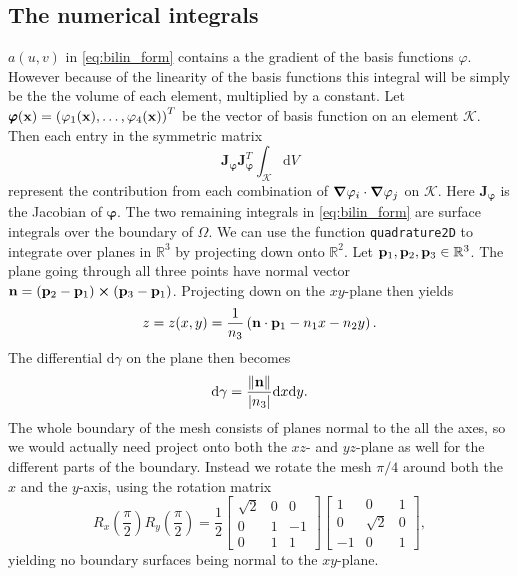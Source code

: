 \subsection{The numerical integrals}
$a(u,v)$ in \eqref{eq:bilin_form} contains a the gradient of the basis functions $\varphi$. However because of the linearity of the basis functions this integral will be simply be the the volume of each element, multiplied by a constant. Let $\pmb{\varphi}(\vb{x}) = \left(\varphi_1(\vb{x}),\dots,\varphi_4(\vb{x})\right)^T$ be the vector of basis function on an element $\mathcal{K}$. Then each entry in the symmetric matrix
\begin{equation}
    \pmb{J}_{\pmb{\varphi}}^{\phantom{}} \pmb{J}_{\pmb{\varphi}}^T\int_\mathcal{K} \! \mathrm{d}V
\end{equation}
represent the contribution from each combination of $\grad{\varphi_i}\cdot\grad{\varphi_j}$ on $\mathcal{K}$. Here $\pmb{J}_{\pmb{\varphi}}$ is the Jacobian of $\pmb{\varphi}$. The two remaining integrals in \eqref{eq:bilin_form} are surface integrals over the boundary of $\Omega$. We can use the function \texttt{quadrature2D} to integrate over planes in $\mathbb{R}^3$ by projecting down onto $\mathbb{R}^2$. Let $\vb{p}_1,\vb{p}_2,\vb{p}_3 \in \mathbb{R}^3$. The plane going through all three points have normal vector $\vb{n} = (\vb{p}_2-\vb{p}_1)\cross (\vb{p}_3-\vb{p}_1)$. Projecting down on the $xy$-plane then yields
\begin{equation}
    z = z(x,y)=\frac{1}{n_3}\left(\vb{n}\cdot \vb{p}_1-n_1x-n_2y\right).
\end{equation}
The differential $\mathrm{d}\gamma$ on the plane then becomes
\begin{equation}
    \mathrm{d}\gamma = \frac{\norm{\vb{n}}}{\abs{n_3}}\mathrm{d}x\mathrm{d}y.
\end{equation}
The whole boundary of the mesh consists of planes normal to the all the axes, so we would actually need project onto both the $xz$- and $yz$-plane as well for the different parts of the boundary. Instead we rotate the mesh $\pi/4$ around both the $x$ and the $y$-axis, using the rotation matrix
\begin{equation}
    R_x\left(\frac{\pi}{2}\right)R_y\left(\frac{\pi}{2}\right) = \frac{1}{2}
    \begin{bmatrix}
        \sqrt{2} & 0 & 0 \\
        0 & 1 & -1 \\
        0 & 1 & 1
     \end{bmatrix}
     \begin{bmatrix}
        1 & 0 & 1 \\
        0 & \sqrt{2} & 0 \\
        -1 & 0 & 1
     \end{bmatrix},
\end{equation}
yielding no boundary surfaces being normal to the $xy$-plane.

